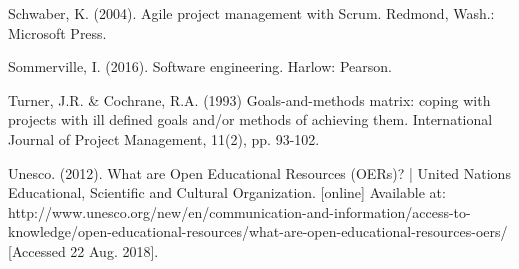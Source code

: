 \begin{thebibliography}{69}
     Schwaber, K. (2004). Agile project management with Scrum. Redmond, Wash.: Microsoft Press.
    
     Sommerville, I. (2016). Software engineering. Harlow: Pearson.

     Turner, J.R. \& Cochrane, R.A. (1993) Goals-and-methods matrix: coping with projects with ill defined goals and/or methods of achieving them. International Journal of Project Management, 11(2), pp. 93-102.
  
     Unesco. (2012). What are Open Educational Resources (OERs)? | United Nations Educational, Scientific and Cultural Organization. [online] Available at: http://www.unesco.org/new/en/communication-and-information/access-to-knowledge/open-educational-resources/what-are-open-educational-resources-oers/ [Accessed 22 Aug. 2018].
 

\end{thebibliography}



